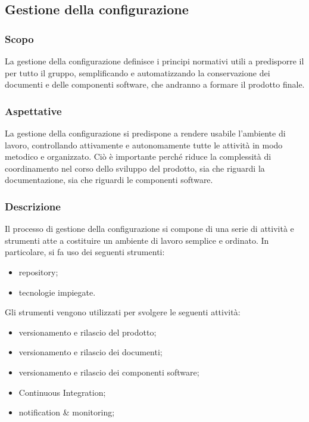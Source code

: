 \subsection{Gestione della configurazione}


\subsubsection{Scopo}

La gestione della configurazione definisce i principi normativi utili a predisporre il  per tutto il gruppo, semplificando e automatizzando la conservazione dei documenti e delle componenti software, che andranno a formare il prodotto finale.

\subsubsection{Aspettative}

La gestione della configurazione si predispone a rendere usabile l'ambiente di lavoro, controllando attivamente e autonomamente tutte le attività in modo metodico e organizzato. Ciò è importante perché riduce la complessità di coordinamento nel corso dello sviluppo del prodotto, sia che riguardi la documentazione, sia che riguardi le componenti software.

\subsubsection{Descrizione}

Il processo di gestione della configurazione si compone di una serie di attività e strumenti atte a costituire un ambiente di lavoro semplice e ordinato. 
In particolare, si fa uso dei seguenti strumenti:
\begin{itemize}
	\item repository;
	\item tecnologie impiegate.
\end{itemize}

Gli strumenti vengono utilizzati per svolgere le seguenti attività:
\begin{itemize}
	\item versionamento e rilascio del prodotto;
	\item versionamento e rilascio dei documenti;
	\item versionamento e rilascio dei componenti software;
	\item Continuous Integration;
	\item notification \& monitoring;
\end{itemize}


